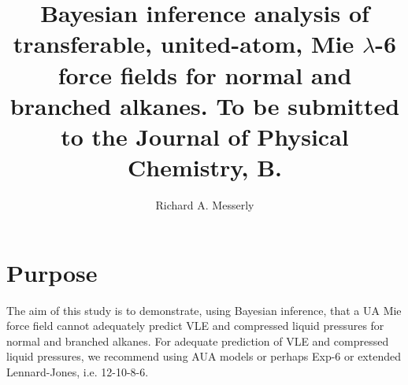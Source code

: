 \documentclass[preprint,letterpaper,floatfix,citeautoscript,aip,jcp]{revtex4-1}
\begin{document}
\title{Bayesian inference analysis of transferable, united-atom, Mie $\lambda$-6 force fields for normal and branched alkanes. To be submitted to the Journal of Physical Chemistry, B.}
\author{Richard A. Messerly}


\begin{abstract}

\end{abstract}

\maketitle

\section*{Purpose}

The aim of this study is to demonstrate, using Bayesian inference, that a UA Mie force field cannot adequately predict VLE and compressed liquid pressures for normal and branched alkanes. For adequate prediction of VLE and compressed liquid pressures, we recommend using AUA models or perhaps Exp-6 or extended Lennard-Jones, i.e. 12-10-8-6. %
\end{document}
